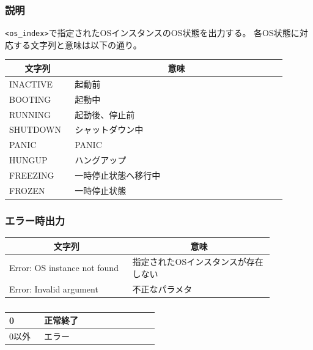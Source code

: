 \documentclass[twoside,11pt,fleqn]{book}
\begin{document}
\subsubsection*{説明}{\quad}
\texttt{<os\_index>}で指定されたOSインスタンスのOS状態を出力する。
各OS状態に対応する文字列と意味は以下の通り。
\begin{table}[!h]
\footnotesize
\begin{tabular}{|p{0.20\linewidth}|p{0.70\linewidth}|} \hline
\multicolumn{1}{|c}{\textbf{文字列}}&\multicolumn{1}{|c|}{\textbf{意味}}\\ \hline \hline
INACTIVE  & 起動前              \\ \hline
BOOTING   & 起動中              \\ \hline
RUNNING   & 起動後、停止前      \\ \hline
SHUTDOWN  & シャットダウン中    \\ \hline
PANIC     & PANIC               \\ \hline
HUNGUP    & ハングアップ              \\ \hline
FREEZING  & 一時停止状態へ移行中\\ \hline
FROZEN    & 一時停止状態\\ \hline
\end{tabular}
\vspace{-0em}
\end{table}
\FloatBarrier

\subsubsection*{エラー時出力}{\quad}
\begin{table}[!h]
\footnotesize
\begin{tabular}{|p{0.40\linewidth}|p{0.46\linewidth}|} \hline
\multicolumn{1}{|c}{\textbf{文字列}}&\multicolumn{1}{|c|}{\textbf{意味}}\\ \hline \hline
Error: OS instance not found&指定されたOSインスタンスが存在しない\\ \hline
Error: Invalid argument&不正なパラメタ\\ \hline
\end{tabular}
\vspace{-0em}
\end{table}
\FloatBarrier

\subsubsection*{}
\begin{table}[!h]
\footnotesize
\begin{tabular}{|p{0.20\linewidth}|p{0.66\linewidth}|} \hline
0&正常終了\\ \hline
0以外&エラー\\ \hline
\end{tabular}
\vspace{-0em}
\end{table}
\FloatBarrier
\end{document}
